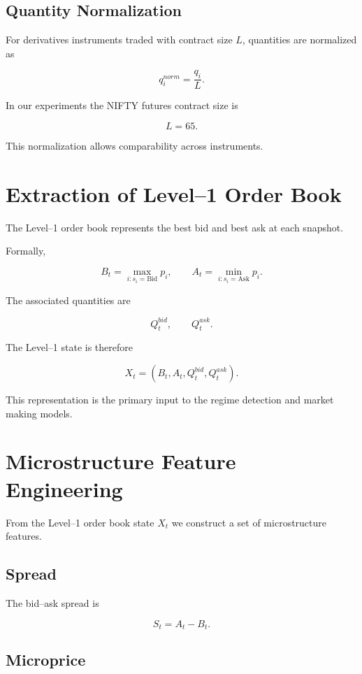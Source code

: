 \documentclass[11pt]{article}
\begin{document}
\subsection{Quantity Normalization}

For derivatives instruments traded with contract size $L$, quantities are normalized as

\[
q_i^{norm} = \frac{q_i}{L}.
\]

In our experiments the NIFTY futures contract size is

\[
L = 65.
\]

This normalization allows comparability across instruments.

\section{Extraction of Level--1 Order Book}

The Level--1 order book represents the best bid and best ask at each snapshot.

Formally,

\[
B_t = \max_{i:s_i=\text{Bid}} p_i, \qquad
A_t = \min_{i:s_i=\text{Ask}} p_i.
\]

The associated quantities are

\[
Q_t^{bid}, \qquad Q_t^{ask}.
\]

The Level--1 state is therefore

\[
X_t = (B_t,A_t,Q_t^{bid},Q_t^{ask}).
\]

This representation is the primary input to the regime detection and market making models.

\section{Microstructure Feature Engineering}

From the Level--1 order book state $X_t$ we construct a set of microstructure features.

\subsection{Spread}

The bid--ask spread is

\[
S_t = A_t - B_t.
\]

\subsection{Microprice}
\end{document}
